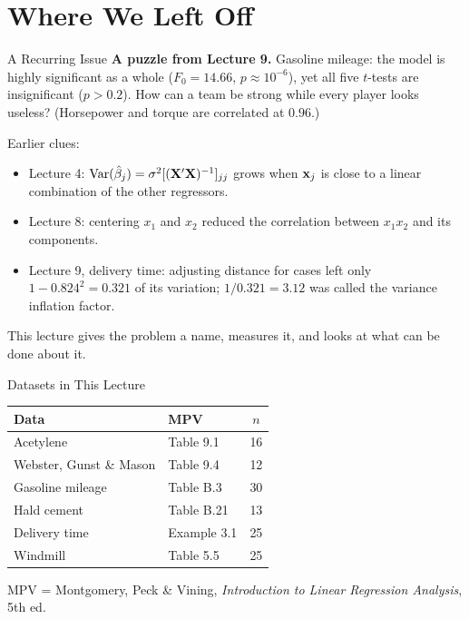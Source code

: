 \section{Where We Left Off}


\begin{frame}{A Recurring Issue}
    \small
    \textbf{A puzzle from Lecture 9.} Gasoline mileage: the model is highly significant as a whole ($F_0=14.66$, $p\approx10^{-6}$), yet all five $t$-tests are insignificant ($p>0.2$). How can a team be strong while every player looks useless? (Horsepower and torque are correlated at $0.96$.)

    Earlier clues:
    \begin{itemize}
        \item Lecture 4: $\operatorname{Var}(\hat\beta_j)=\sigma^2[(\mathbf{X}'\mathbf{X})^{-1}]_{jj}$ grows when $\mathbf{x}_j$ is close to a linear combination of the other regressors.
        \item Lecture 8: centering $x_1$ and $x_2$ reduced the correlation between $x_1x_2$ and its components.
        \item Lecture 9, delivery time: adjusting distance for cases left only $1-0.824^2=0.321$ of its variation; $1/0.321=3.12$ was called the variance inflation factor.
    \end{itemize}
    This lecture gives the problem a name, measures it, and looks at what can be done about it.
\end{frame}


\begin{frame}{Datasets in This Lecture}
    \begin{center}
        \footnotesize
        \begin{tabular}{llc}
            \toprule
            Data & MPV & $n$ \\
            \midrule
            Acetylene & Table 9.1 & 16 \\
            Webster, Gunst \& Mason & Table 9.4 & 12 \\
            Gasoline mileage & Table B.3 & 30 \\
            Hald cement & Table B.21 & 13 \\
            Delivery time & Example 3.1 & 25 \\
            Windmill & Table 5.5 & 25 \\
            \bottomrule
        \end{tabular}
    \end{center}
    MPV = Montgomery, Peck \& Vining, \emph{Introduction to Linear Regression Analysis}, 5th ed.
\end{frame}


